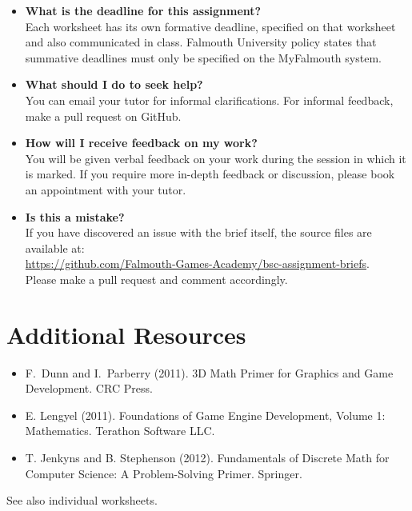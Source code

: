 \documentclass{../../fal_assignment}
\begin{document}
\begin{itemize}
	\item 	\textbf{What is the deadline for this assignment?} \\ 
			Each worksheet has its own formative deadline, specified on that worksheet and also communicated in class.
    		Falmouth University policy states that summative deadlines must only be specified on the MyFalmouth system.
    		
	\item 	\textbf{What should I do to seek help?} \\ 
    		You can email your tutor for informal clarifications. For informal feedback, make a pull request on GitHub. 
    		
	\item 	\textbf{How will I receive feedback on my work?} \\ 
    		You will be given verbal feedback on your work during the session in which it is marked.
    		If you require more in-depth feedback or discussion, please book an appointment with your tutor.
    		
    	\item 	\textbf{Is this a mistake?} \\ 	
    		If you have discovered an issue with the brief itself, the source files are available at: \\
    		\url{https://github.com/Falmouth-Games-Academy/bsc-assignment-briefs}.\\
    		 Please make a pull request and comment accordingly.
\end{itemize}

\section*{Additional Resources}

\begin{itemize}
    \item F.\ Dunn and I.\ Parberry (2011). 3D Math Primer for Graphics and Game Development. CRC Press.
    \item E. Lengyel (2011). Foundations of Game Engine Development, Volume 1: Mathematics. Terathon Software LLC.
    \item T. Jenkyns and B. Stephenson (2012). Fundamentals of Discrete Math for Computer Science: A Problem-Solving Primer. Springer.
\end{itemize}

See also individual worksheets.
\end{document}
